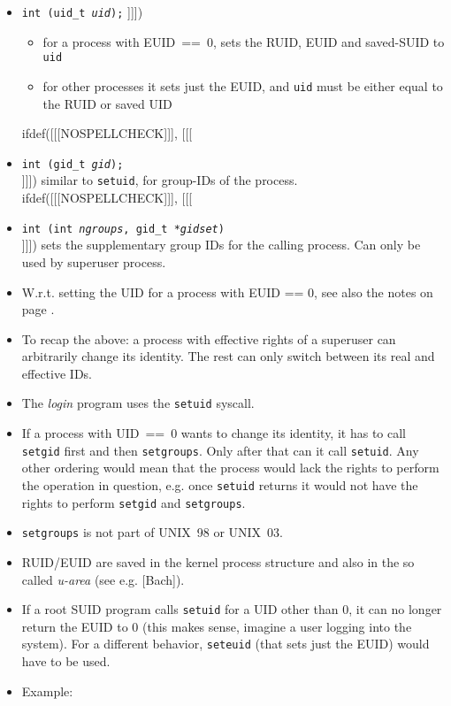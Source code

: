 \begin{slide}
\begin{itemize}
ifdef([[[NOSPELLCHECK]]], [[[
\item \texttt{int (uid\_t \emph{uid});}
]]])
    \begin{itemize}
    \item for a process with EUID~==~0, sets the RUID, EUID and saved-SUID to
    \texttt{uid}
    \item for other processes it sets just the EUID, and \texttt{uid} must be
    either equal to the RUID or saved UID
    \end{itemize}
ifdef([[[NOSPELLCHECK]]], [[[
\item \texttt{int (gid\_t \emph{gid});} \\
]]])
similar to \texttt{setuid}, for group-IDs of the process.
ifdef([[[NOSPELLCHECK]]], [[[
\item \texttt{int (int \emph{ngroups},
gid\_t *\emph{gidset})} \\
]]])
sets the supplementary group IDs for the calling process. Can only be used
by superuser process.
\end{itemize}
\end{slide}

\begin{itemize}
\item W.r.t. setting the UID for a process with EUID == 0, see also the notes on page
\pageref{ROOT_SETUID}.
\item To recap the above: a process with effective rights of a superuser can
arbitrarily change its identity. The rest can only switch between its real and
effective IDs.
\item The \emph{login} program uses the \texttt{setuid} syscall.
\item If a process with UID~==~0 wants to change its identity, it has to call
\texttt{setgid} first and then \texttt{setgroups}. Only after that can it call
\texttt{setuid}. Any other ordering would mean that the process would lack the
rights to perform the operation in question, e.g. once \texttt{setuid} returns
it would not have the rights to perform \texttt{setgid} and \texttt{setgroups}.
\item \texttt{setgroups} is not part of UNIX~98 or UNIX~03.
\item RUID/EUID are saved in the kernel process structure and also in the so
called \emph{u-area} (see e.g. [Bach]).
\item If a root SUID program calls \texttt{setuid} for a UID other than 0, it can
no longer return the EUID to 0 (this makes sense, imagine a user logging into the
system). For a different behavior, \texttt{seteuid} (that sets just the EUID) would
have to be used.
\item Example: 
\end{itemize}

